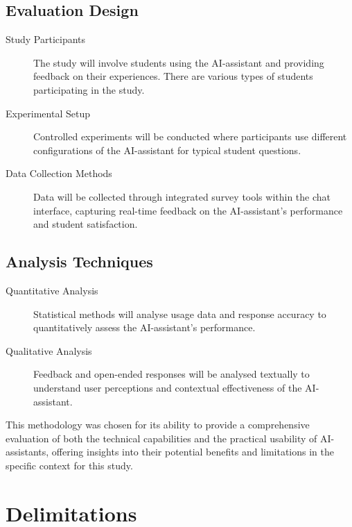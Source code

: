 \subsection{Evaluation Design}
\begin{description}
        \item[Study Participants] The study will involve students using the AI-assistant and providing feedback on their experiences. There are various types of students participating in the study.
        \item[Experimental Setup] Controlled experiments will be conducted where participants use different configurations of the AI-assistant for typical student questions.
        \item[Data Collection Methods] Data will be collected through integrated survey tools within the chat interface, capturing real-time feedback on the AI-assistant’s performance and student satisfaction.
\end{description}


\subsection{Analysis Techniques}
\begin{description}
        \item[Quantitative Analysis] Statistical methods will analyse usage data and response accuracy to quantitatively assess the AI-assistant's performance.
        \item[Qualitative Analysis] Feedback and open-ended responses will be analysed textually to understand user perceptions and contextual effectiveness of the AI-assistant.
\end{description}


This methodology was chosen for its ability to provide a comprehensive evaluation of both the technical capabilities and the practical usability of AI-assistants, offering insights into their potential benefits and limitations in the specific context for this study.




\section{Delimitations}
\label{sec:delimitations}




